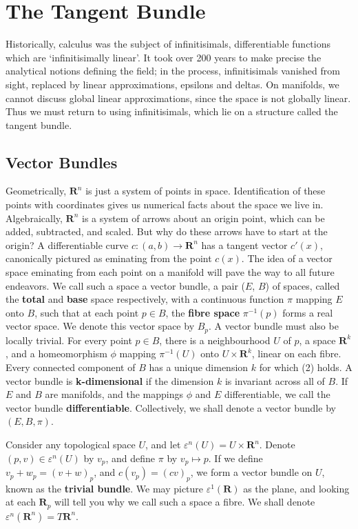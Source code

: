 \chapter{The Tangent Bundle}

Historically, calculus was the subject of infinitisimals, differentiable functions which are `infinitisimally linear'. It took over 200 years to make precise the analytical notions defining the field; in the process, infinitisimals vanished from sight, replaced by linear approximations, epsilons and deltas. On manifolds, we cannot discuss global linear approximations, since the space is not globally linear. Thus we must return to using infinitisimals, which lie on a structure called the tangent bundle.

\section{Vector Bundles}

Geometrically, $\mathbf{R}^n$ is just a system of points in space. Identification of these points with coordinates gives us numerical facts about the space we live in. Algebraically, $\mathbf{R}^n$ is a system of arrows about an origin point, which can be added, subtracted, and scaled. But why do these arrows have to start at the origin? A differentiable curve $c:(a,b) \to \mathbf{R}^n$ has a tangent vector $c'(x)$, canonically pictured as eminating from the point $c(x)$. The idea of a vector space eminating from each point on a manifold will pave the way to all future endeavors. We call such a space a vector bundle, a pair ($E$, $B$) of spaces, called the {\bf total} and {\bf base} space respectively, with a continuous function $\pi$ mapping $E$ onto $B$, such that at each point $p \in B$, the {\bf fibre space} $\pi^{-1}(p)$ forms a real vector space. We denote this vector space by $B_p$. A vector bundle must also be locally trivial. For every point $p \in B$, there is a neighbourhood $U$ of $p$, a space $\mathbf{R}^k$, and a homeomorphism $\phi$ mapping $\pi^{-1}(U)$ onto $U \times \mathbf{R}^k$, linear on each fibre.
%
Every connected component of $B$ has a unique dimension $k$ for which (2) holds. A vector bundle is {\bf k-dimensional} if the dimension $k$ is invariant across all of $B$. If $E$ and $B$ are manifolds, and the mappings $\phi$ and $E$ differentiable, we call the vector bundle {\bf differentiable}. Collectively, we shall denote a vector bundle by $(E,B,\pi)$.

\begin{example}
    Consider any topological space $U$, and let $\varepsilon^n(U) = U \times \mathbf{R}^n$. Denote $(p,v) \in \varepsilon^n(U)$ by $v_p$, and define $\pi$ by $v_p \mapsto p$. If we define $v_p + w_p = (v + w)_p$, and $c(v_p) = (cv)_p$, we form a vector bundle on $U$, known as the {\bf trivial bundle}. We may picture $\varepsilon^1(\mathbf{R})$ as the plane, and looking at each $\mathbf{R}_p$ will tell you why we call such a space a fibre. We shall denote $\varepsilon^n(\mathbf{R}^n) = T\mathbf{R}^n$.
\end{example}

